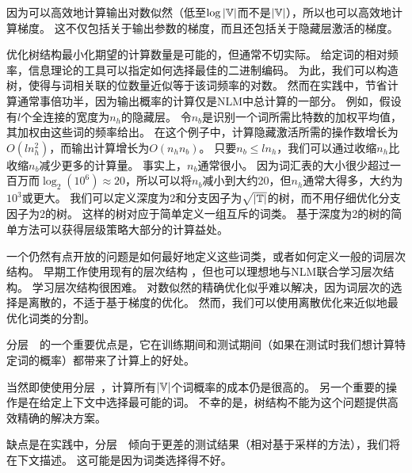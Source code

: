 因为可以高效地计算输出对数似然（低至$\log |\mathbb{V}|$而不是$ |\mathbb{V}|$），所以也可以高效地计算梯度。
这不仅包括关于输出参数的梯度，而且还包括关于隐藏层激活的梯度。

优化树结构最小化期望的计算数量是可能的，但通常不切实际。
给定词的相对频率，信息理论的工具可以指定如何选择最佳的二进制编码。
为此，我们可以构造树，使得与词相关联的位数量近似等于该词频率的对数。
然而在实践中，节省计算通常事倍功半，因为输出概率的计算仅是\gls{NLM}中总计算的一部分。
例如，假设有$l$个全连接的宽度为$n_h$的隐藏层。
令$n_b$是识别一个词所需比特数的加权平均值，其加权由这些词的频率给出。
在这个例子中，计算隐藏激活所需的操作数增长为$O(ln_h^2)$，而输出计算增长为$O(n_h n_b)$。
只要$ n_b \leq l n_h$，我们可以通过收缩$n_h$比收缩$n_b$减少更多的计算量。
事实上，$n_b$通常很小。
因为词汇表的大小很少超过一百万而$\log_ 2(10^6) \approx 20$，所以可以将$n_b$减小到大约20，但$n_h$通常大得多，大约为$10^3$或更大。
我们可以定义深度为2和分支因子为$\sqrt{|\mathbb{T}|}$的树，而不用仔细优化分支因子为$2$的树。
这样的树对应于简单定义一组互斥的词类。
基于深度为$2$的树的简单方法可以获得层级策略大部分的计算益处。


一个仍然有点开放的问题是如何最好地定义这些词类，或者如何定义一般的词层次结构。
早期工作使用现有的层次结构\citep{Morin+Bengio-2005-small} ，但也可以理想地与\gls{NLM}联合学习层次结构。
学习层次结构很困难。
对数似然的精确优化似乎难以解决，因为词层次的选择是离散的，不适于基于梯度的优化。
然而，我们可以使用离散优化来近似地最优化词类的分割。

分层~~的一个重要优点是，它在训练期间和测试期间（如果在测试时我们想计算特定词的概率）都带来了计算上的好处。

当然即使使用分层~，计算所有$|\mathbb{V}|$个词概率的成本仍是很高的。
另一个重要的操作是在给定上下文中选择最可能的词。
不幸的是，树结构不能为这个问题提供高效精确的解决方案。

缺点是在实践中，分层~~倾向于更差的测试结果（相对基于采样的方法），我们将在下文描述。
这可能是因为词类选择得不好。

